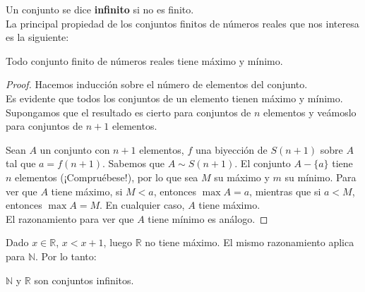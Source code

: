 Un conjunto se dice \textbf{infinito} si no es finito.\\

La principal propiedad de los conjuntos finitos de números reales que nos interesa es la siguiente:
\begin{prop}\label{prop:2.3.4}
    Todo conjunto finito de números reales tiene máximo y mínimo.    
\end{prop}
\begin{proof}
    Hacemos inducción sobre el número de elementos del conjunto.\\
    
    Es evidente que todos los conjuntos de un elemento tienen máximo y mínimo.\\
    
    Supongamos que el resultado es cierto para conjuntos de $n$ elementos y veámoslo para conjuntos de $n+1$ elementos.
    
    Sean $A$ un conjunto con $n+1$ elementos, $f$ una biyección de $S(n+1)$ sobre $A$ tal que $a=f(n+1)$.
    Sabemos que $A \sim S(n+1)$. El conjunto $A-\{a\}$ tiene $n$ elementos (¡Compruébese!), por lo que sea $M$ su máximo y $m$ su mínimo. Para ver que $A$ tiene máximo, si $M < a$, entonces $\max A = a$, mientras que si $a < M$, entonces $\max A = M$. En cualquier caso, $A$ tiene máximo.\\
    
    El razonamiento para ver que $A$ tiene mínimo es análogo.
\end{proof}

Dado $x \in \mathbb{R}$, $x < x+1$, luego $\mathbb{R}$ no tiene máximo. El mismo razonamiento aplica para $\mathbb{N}$.
Por lo tanto:
\begin{coro}
    $\mathbb{N}$ y $\mathbb{R}$ son conjuntos infinitos.
\end{coro}

